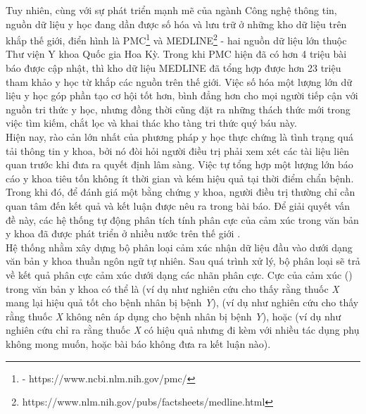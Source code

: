 Tuy nhiên, cùng với sự phát triển mạnh mẽ của ngành Công nghệ thông tin, nguồn dữ liệu y học đang dần được số hóa và lưu trữ ở những kho dữ liệu trên khắp thế giới, điển hình là PMC\footnote{ - https://www.ncbi.nlm.nih.gov/pmc/} và MEDLINE\footnote{https://www.nlm.nih.gov/pubs/factsheets/medline.html} - hai nguồn dữ liệu lớn thuộc Thư viện Y khoa Quốc gia Hoa Kỳ. Trong khi PMC hiện đã có hơn 4 triệu bài báo được cập nhật, thì kho dữ liệu MEDLINE đã tổng hợp được hơn 23 triệu tham khảo y học từ khắp các nguồn trên thế giới. Việc số hóa một lượng lớn dữ liệu y học góp phần tạo cơ hội tốt hơn, bình đẳng hơn cho mọi người tiếp cận với nguồn tri thức y học, nhưng đồng thời cũng đặt ra những thách thức mới trong việc tìm kiếm, chắt lọc và khai thác kho tàng tri thức quý báu này.\\

Hiện nay, rào cản lớn nhất của phương pháp y học thực chứng là tình trạng quá tải thông tin y khoa, bởi nó đòi hỏi người điều trị phải xem xét các tài liệu liên quan trước khi đưa ra quyết định lâm sàng. Việc tự tổng hợp một lượng lớn báo cáo y khoa tiêu tốn không ít thời gian và kém hiệu quả tại thời điểm chẩn bệnh. Trong khi đó, để đánh giá một bằng chứng y khoa, người điều trị thường chỉ cần quan tâm đến kết quả và kết luận được nêu ra trong bài báo. Để giải quyết vấn đề này, các hệ thống tự động phân tích tính phân cực của cảm xúc trong văn bản y khoa đã được phát triển ở nhiều nước trên thế giới \cite{medhat2014sentiment}.\\

Hệ thống nhằm xây dựng bộ phân loại cảm xúc nhận dữ liệu đầu vào dưới dạng văn bản y khoa thuần ngôn ngữ tự nhiên. Sau quá trình xử lý, bộ phân loại sẽ trả về kết quả phân cực cảm xúc dưới dạng các nhãn phân cực. Cực của cảm xúc () trong văn bản y khoa có thể là \tichcuc (ví dụ như nghiên cứu cho thấy rằng thuốc \textit{X} mang lại hiệu quả tốt cho bệnh nhân bị bệnh \textit{Y}), \tieucuc (ví dụ như nghiên cứu cho thấy rằng thuốc \textit{X} không nên áp dụng cho bệnh nhân bị bệnh \textit{Y}), hoặc \trungtinh (ví dụ như nghiên cứu chỉ ra rằng thuốc \textit{X} có hiệu quả nhưng đi kèm với nhiều tác dụng phụ không mong muốn, hoặc bài báo không đưa ra kết luận nào).\\

